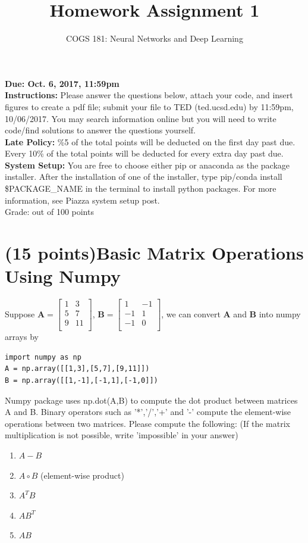 \documentclass[12pt]{article}%
\begin{document}
\title{Homework Assignment 1}
\author{COGS 181: Neural Networks and Deep Learning}
\date{}
\maketitle

\noindent \textbf {Due: Oct. 6, 2017, 11:59pm } \\
\noindent \textbf {Instructions:} Please answer the questions below, attach your code, and insert figures to create a pdf file; submit your file to TED (ted.ucsd.edu) by 11:59pm, 10/06/2017. You may search information online but you will need to write code/find solutions to answer the questions yourself.\\

\noindent \textbf{Late Policy:} \%5 of the total points will be deducted on the first day past due. Every 10\% of the total points will be deducted for every extra day past due.\\

\noindent \textbf{System Setup:} You are free to choose either pip or anaconda as the package installer. After the installation of one of the installer, type pip/conda install \$PACKAGE\_NAME in the terminal to install python packages. For more information, see Piazza system setup post.\\

\noindent Grade: \underline{\hspace{.8cm}} out of 100 points \\
\section{(15 points)Basic Matrix Operations Using Numpy}
Suppose $\mathbf{A}=\begin{bmatrix}
1&3 \\
5&7 \\
9&11 \\
\end{bmatrix}$, 
$\mathbf{B}=\begin{bmatrix}
1 & -1 \\
-1 & 1 \\
-1 & 0 \\
\end{bmatrix}$, we can convert $\mathbf{A}$ and $\mathbf{B}$ into numpy arrays by
\begin{verbatim}
import numpy as np
A = np.array([[1,3],[5,7],[9,11]])
B = np.array([[1,-1],[-1,1],[-1,0]])
\end{verbatim}
Numpy package uses np.dot(A,B) to compute the dot product between matrices A and B. Binary operators such as '*','/','+' and '-' compute the element-wise operations between two matrices. Please compute the following: (If the matrix multiplication is not possible, write 'impossible' in your answer)
\begin{enumerate}
\item $A-B$
\item $A\circ B$ (element-wise product)
\item $A^TB$
\item $AB^T$
\item $AB$
\end{enumerate}
\vspace{30mm}
\end{document}
